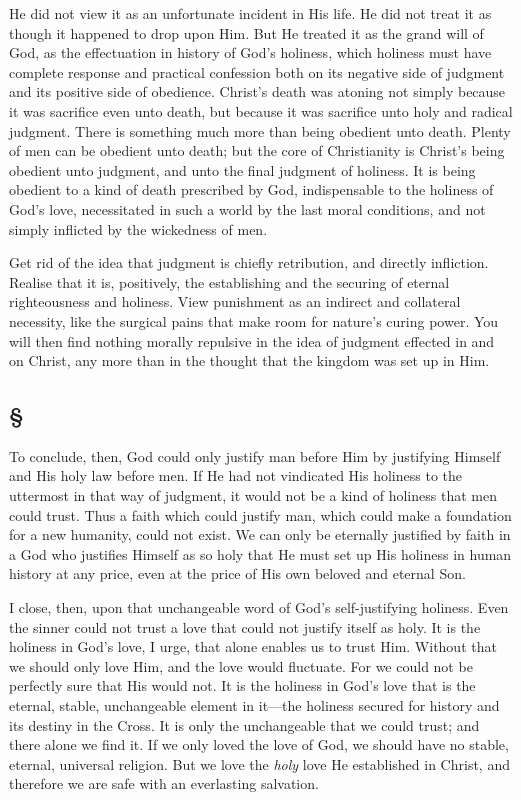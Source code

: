 \documentclass[draft]{ptfdoc}
\begin{document}
He did not view it as an unfortunate incident 
in His life. He did not treat it as though it 
happened to drop upon Him. But He treated 
it as the grand will of God, as the effectuation 
in history of God's holiness, which holiness 
must have complete response and practical 
confession both on its negative side of judgment 
and its positive side of obedience. Christ's 
death was atoning not simply because it was 
sacrifice even unto death, but because it was 
sacrifice unto holy and radical judgment. There 
is something much more than being obedient 
unto death. Plenty of men can be obedient unto 
death; but the core of Christianity is Christ's 
being obedient unto judgment, and unto the 
final judgment of holiness. It is being obedient 
to a kind of death prescribed by God, indispensable 
to the holiness of God's love, necessitated 
in such a world by the last moral conditions, and 
not simply inflicted by the wickedness of men. 

Get rid of the idea that judgment is chiefly 
retribution, and directly infliction. Realise that 
it is, positively, the establishing and the securing 
of eternal righteousness and holiness. View 
punishment as an indirect and collateral necessity, 
like the surgical pains that make room for 
nature's curing power. You will then find 
nothing morally repulsive in the idea of judgment
effected in and on Christ, any more than 
in the thought that the kingdom was set up 
in Him. 

\subsection*{
\S
}

To conclude, then, God could only justify man 
before Him by justifying Himself and His holy 
law before men. If He had not vindicated His 
holiness to the uttermost in that way of judgment, 
it would not be a kind of holiness that 
men could trust. Thus a faith which could 
justify man, which could make a foundation for 
a new humanity, could not exist. We can only 
be eternally justified by faith in a God who 
justifies Himself as so holy that He must set 
up His holiness in human history at any price, 
even at the price of His own beloved and 
eternal Son. 

I close, then, upon that unchangeable word of 
God's self-justifying holiness. Even the sinner 
could not trust a love that could not justify itself 
as holy. It is the holiness in God's love, I urge, 
that alone enables us to trust Him. Without 
that we should only love Him, and the love 
would fluctuate. For we could not be perfectly 
sure that His would not. It is the holiness in 
God's love that is the eternal, stable, unchangeable 
element in it---the holiness secured for 
history and its destiny in the Cross. It is only 
the unchangeable that we could trust; and 
there alone we find it. If we only loved the 
love of God, we should have no stable, eternal, 
universal religion. But we love the \textit{holy} love 
He established in Christ, and therefore we 
are safe with an everlasting salvation. 
\end{document}
